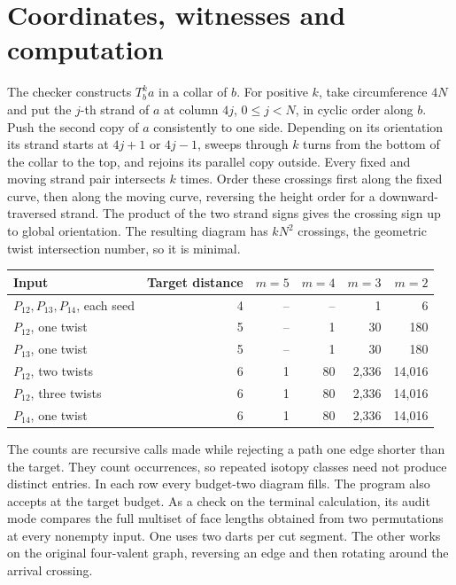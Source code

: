 \documentclass[11pt,a4paper]{article}
\begin{document}
\clearpage
\section{Coordinates, witnesses and computation}\label{sec:results}
The checker constructs \(T_b^k a\) in a collar of \(b\). For positive
\(k\), take circumference \(4N\) and put the \(j\)-th strand of \(a\)
at column \(4j\), \(0\le j<N\), in cyclic order along \(b\). Push the
second copy of \(a\) consistently to one side. Depending on its
orientation its strand starts at \(4j+1\) or \(4j-1\), sweeps through
\(k\) turns from the bottom of the collar to the top, and rejoins its
parallel copy outside. Every fixed and moving strand pair intersects
\(k\) times. Order these crossings first along the fixed curve, then
along the moving curve, reversing the height order for a
downward-traversed strand. The product of the two strand signs gives
the crossing sign up to global orientation. The resulting diagram has
\(kN^2\) crossings, the geometric twist intersection number, so it is
minimal.

\begin{center}
\small
\begin{tabular}{lrrrrr}
\toprule
Input & Target distance & \(m=5\) & \(m=4\) & \(m=3\) & \(m=2\)\\
\midrule
\(P_{12},P_{13},P_{14}\), each seed &4&--&--&1&6\\
\(P_{12}\), one twist &5&--&1&30&180\\
\(P_{13}\), one twist &5&--&1&30&180\\
\(P_{12}\), two twists &6&1&80&2,336&14,016\\
\(P_{12}\), three twists &6&1&80&2,336&14,016\\
\(P_{14}\), one twist &6&1&80&2,336&14,016\\
\bottomrule
\end{tabular}
\end{center}
The counts are recursive calls made while rejecting a path one edge shorter
than the target. They count occurrences, so repeated isotopy classes need
not produce distinct entries. In each row every budget-two diagram fills.
The program also accepts at the target budget. As a check on the terminal
calculation, its audit mode compares the full multiset of face lengths
obtained from two permutations at every nonempty input. One uses two
darts per cut segment. The other works on the original four-valent
graph, reversing an edge and then rotating around the arrival crossing.
\end{document}
